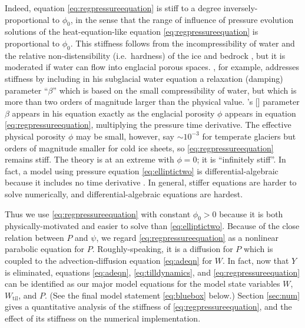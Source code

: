 \documentclass[11pt,final]{amsart}
\newcommand{\Wtil}{W_{\text{til}}}
\newcommand{\citeapos}[1]{\citeauthor{#1}'s [\citeyear{#1}]}
\begin{document}
Indeed, equation \eqref{eq:regpressureequation} is stiff to a degree inversely-proportional to $\phi_0$, in the sense that the range of influence of pressure evolution solutions of the heat-equation-like equation \eqref{eq:regpressureequation} is proportional to $\phi_0$.  This stiffness follows from the incompressibility of water and the relative non-distensibility (i.e.~hardness) of the ice and bedrock \citep{Clarke2003}, but it is moderated if water can flow into englacial porous spaces.  \cite{Clarke2003}, for example, addresses stiffness by including in his subglacial water equation a relaxation (damping) parameter  ``$\beta$'' which is based on the small compressibility of water, but which is more than two orders of magnitude larger than the physical value.  \citeapos{Clarke2003} parameter $\beta$ appears in his equation exactly as the englacial porosity $\phi$ appears in equation \eqref{eq:regpressureequation}, multiplying the pressure time derivative.  The effective physical porosity $\phi$ may be small, however, say $\sim 10^{-3}$ for temperate glaciers but orders of magnitude smaller for cold ice sheets, so \eqref{eq:regpressureequation} remains stiff.  The \cite{Schoofetal2012} theory is at an extreme with $\phi=0$; it is ``infinitely stiff''.  In fact, a model using pressure equation \eqref{eq:elliptictwo} is differential-algebraic because it includes no time derivative \citep{AscherPetzold}.  In general, stiffer equations are harder to solve numerically, and differential-algebraic equations are hardest.

Thus we use \eqref{eq:regpressureequation} with constant $\phi_0>0$ because it is both physically-motivated and easier to solve than \eqref{eq:elliptictwo}.  Because of the close relation between $P$ and $\psi$, we regard \eqref{eq:regpressureequation} as a nonlinear parabolic equation for $P$.  Roughly-speaking, it is a diffusion for $P$ which is coupled to the advection-diffusion equation \eqref{eq:adeqn} for $W$.  In fact, now that $Y$ is eliminated, equations \eqref{eq:adeqn}, \eqref{eq:tilldynamics}, and \eqref{eq:regpressureequation} can be identified as our major model equations for the model state variables $W$, $\Wtil$, and $P$.  (See the final model statement \eqref{eq:bluebox} below.)  Section \ref{sec:num} gives a quantitative analysis of the stiffness of \eqref{eq:regpressureequation}, and the effect of its stiffness on the numerical implementation.
\end{document}
